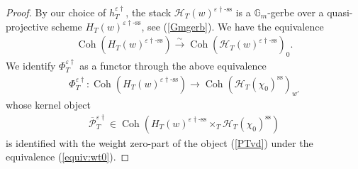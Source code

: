 \documentclass[11pt,oneside,a4paper,mathscr]{amsart}
\theoremstyle{definition}
\newcommand{\cH}{\mathcal{H}}
\newcommand{\cP}{\mathcal{P}}
\newcommand{\Coh}{\operatorname{Coh}}
\newcommand{\vd}{\varepsilon\dag}
\begin{document}
\begin{proof}
By our choice of $h_T^{\varepsilon\dag}$, the stack 
$\cH_T(w)^{\varepsilon\dag \text{-ss}}$ is a $\mathbb{G}_m$-gerbe over 
a quasi-projective scheme $H_T(w)^{\varepsilon\dag \text{-ss}}$, see (\ref{Gmgerb}). 
We have the equivalence 
\begin{align}\label{equiv:wt0}
\Coh(H_T(w)^{\varepsilon\dag \text{-ss}}) \stackrel{\sim}{\to}
    \Coh(\cH_T(w)^{\varepsilon\dag \text{-ss}})_0. 
\end{align}
We identify $\Phi_T^{\varepsilon \dag}$ as a functor through the above equivalence
\begin{align*}
    \Phi_T^{\varepsilon \dag} \colon 
    \Coh(H_T(w)^{\varepsilon\dag\text{-ss}}) \to 
  \Coh(\cH_T(\chi_0)^{\mathrm{ss}})_{w'}
\end{align*}
whose kernel object 
\begin{align*}
    \overline{\cP}_T^{\vd} \in \Coh(H_T(w)^{\varepsilon\dag\text{-ss}}\times_T \cH_T(\chi_0)^{\text{ss}})
\end{align*}
is identified with the weight zero-part 
of the object (\ref{PTvd}) under the equivalence (\ref{equiv:wt0}).  


\end{proof}
\end{document}
